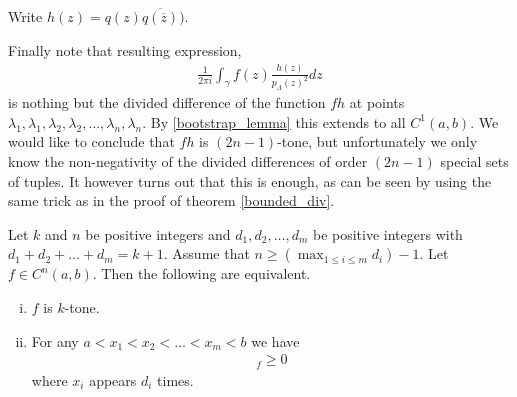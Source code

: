 Write $h(z) = q(z)\overline{q(\overline{z})})$.

Finally note that resulting expression,
\begin{align*}
\frac{1}{2 \pi i}\int_{\gamma}f(z) \frac{h(z)}{p_{\Lambda}(z)^2}dz
\end{align*}
is nothing but the divided difference of the function $f h$ at points $\lambda_{1}, \lambda_{1}, \lambda_{2}, \lambda_{2}, \ldots, \lambda_{n}, \lambda_{n}$. By \ref{bootstrap_lemma} this extends to all $C^{1}(a, b)$. We would like to conclude that $f h$ is $(2 n - 1)$-tone, but unfortunately we only know the non-negativity of the divided differences of order $(2 n - 1)$ special sets of tuples. It however turns out that this is enough, as can be seen by using the same trick as in the proof of theorem \ref{bounded_div}.

\begin{lem}
	Let $k$ and $n$ be positive integers and $d_{1}, d_{2}, \ldots, d_{m}$ be positive integers with $d_{1} + d_{2} + \ldots + d_{m} = k + 1$. Assume that $n \geq \left(\max_{1 \leq i \leq m} d_{i} \right) - 1$. Let $f \in C^{n}(a, b)$. Then the following are equivalent.
	\begin{enumerate}[(i)]
		\item $f$ is $k$-tone.
		\item For any $a < x_{1} < x_{2} < \ldots < x_{m} < b$ we have
		\begin{align*}
			[x_{1}, x_{1}, \ldots, x_{1}, x_{2}, \ldots, x_{2}, \ldots, x_{m}, \ldots, x_{m}]_{f} \geq 0
		\end{align*}
		where $x_{i}$ appears $d_{i}$ times.
	\end{enumerate}
\end{lem}

